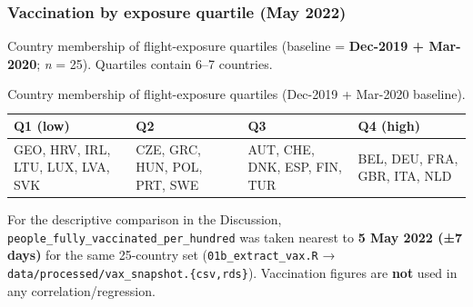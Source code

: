 \documentclass[
  authoryear,
  preprint,
  3p,
  onecolumn]{elsarticle}
\begin{document}
\clearpage

\subsubsection{Vaccination by exposure quartile (May
2022)}\label{vaccination-by-exposure-quartile-may-2022}

Country membership of flight-exposure quartiles (baseline =
\textbf{Dec-2019 + Mar-2020}; \emph{n} = 25). Quartiles contain 6--7
countries.

\begin{longtable}[]{@{}
  >{\raggedright\arraybackslash}p{}
  >{\raggedright\arraybackslash}p{}
  >{\raggedright\arraybackslash}p{}
  >{\raggedright\arraybackslash}p{}@{}}

\caption{\label{tbl-vaccination-quartiles}Country membership of
flight-exposure quartiles (Dec-2019 + Mar-2020 baseline).}

\tabularnewline

\toprule\noalign{}
\begin{minipage}[b]{\linewidth}\raggedright
Q1 (low)
\end{minipage} & \begin{minipage}[b]{\linewidth}\raggedright
Q2
\end{minipage} & \begin{minipage}[b]{\linewidth}\raggedright
Q3
\end{minipage} & \begin{minipage}[b]{\linewidth}\raggedright
Q4 (high)
\end{minipage} \\
\midrule\noalign{}
\endhead
\bottomrule\noalign{}
\endlastfoot
GEO, HRV, IRL, LTU, LUX, LVA, SVK & CZE, GRC, HUN, POL, PRT, SWE & AUT,
CHE, DNK, ESP, FIN, TUR & BEL, DEU, FRA, GBR, ITA, NLD \\

\end{longtable}

For the descriptive comparison in the Discussion,
\texttt{people\_fully\_vaccinated\_per\_hundred} was taken nearest to
\textbf{5 May 2022 (±7 days)} for the same 25-country set
(\texttt{01b\_extract\_vax.R} →
\texttt{data/processed/vax\_snapshot.\{csv,rds\}}). Vaccination figures
are \textbf{not} used in any correlation/regression.
\end{document}
